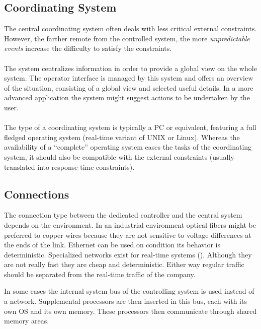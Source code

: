 \documentclass[../main.tex]{subfiles}
\begin{document}
\subsection{Coordinating System}
The central coordinating system often deals with less critical external constraints. However, the farther remote from the controlled system, the more \textit{unpredictable events} increase the difficulty to satisfy the constraints.
\\\\
The system centralizes information in order to provide a global view on the whole system. The operator interface is managed by this system and offers an overview of the situation, consisting of a global view and selected useful details. In a more advanced application the system might suggest actions to be undertaken by the user.
\\\\
The type of a coordinating system is typically a PC or equivalent, featuring a full fledged operating system (real-time variant of UNIX or Linux). Whereas the availability of a ``complete'' operating system eases the tasks of the coordinating system, it should also be compatible with the external constraints (usually translated into response time constraints).

\subsection{Connections}
The connection type between the dedicated controller and the central system depends on the environment.
In an industrial environment optical fibers might be preferred to copper wires because they are not sensitive to voltage differences at the ends of the link.
Ethernet can be used on condition its behavior is deterministic.
Specialized networks exist for real-time systems ().
Although they are not really fast they are cheap and deterministic. Either way regular traffic should be separated from the  real-time traffic of the company.

In some cases the internal system bus of the controlling system is used instead of a network. Supplemental processors are then inserted in this bus, each with its own OS and its own memory. These processors then communicate through shared memory areas.
\end{document}
